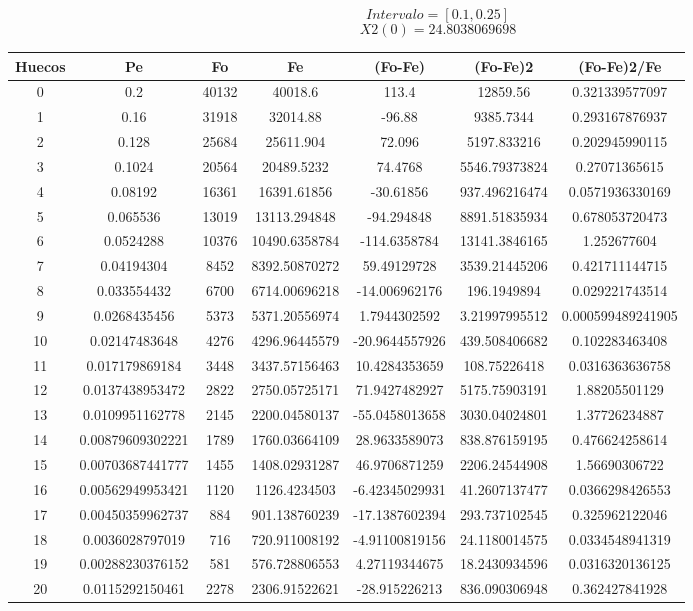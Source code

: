\documentclass{article}
\begin{document}
$$
Intervalo = [0.1, 0.25]
$$
$$
X2(0) = 24.8038069698
$$
\begin{tabular}{|c|c|c|c|c|c|c|}
Huecos&Pe&Fo&Fe&(Fo{-}Fe)&(Fo{-}Fe)2&(Fo{-}Fe)2/Fe\\
\hline
0&0.2&40132&40018.6&113.4&12859.56&0.321339577097\\
\hline
1&0.16&31918&32014.88&{-}96.88&9385.7344&0.293167876937\\
\hline
2&0.128&25684&25611.904&72.096&5197.833216&0.202945990115\\
\hline
3&0.1024&20564&20489.5232&74.4768&5546.79373824&0.27071365615\\
\hline
4&0.08192&16361&16391.61856&{-}30.61856&937.496216474&0.0571936330169\\
\hline
5&0.065536&13019&13113.294848&{-}94.294848&8891.51835934&0.678053720473\\
\hline
6&0.0524288&10376&10490.6358784&{-}114.6358784&13141.3846165&1.252677604\\
\hline
7&0.04194304&8452&8392.50870272&59.49129728&3539.21445206&0.421711144715\\
\hline
8&0.033554432&6700&6714.00696218&{-}14.006962176&196.1949894&0.029221743514\\
\hline
9&0.0268435456&5373&5371.20556974&1.7944302592&3.21997995512&0.000599489241905\\
\hline
10&0.02147483648&4276&4296.96445579&{-}20.9644557926&439.508406682&0.102283463408\\
\hline
11&0.017179869184&3448&3437.57156463&10.4284353659&108.75226418&0.0316363636758\\
\hline
12&0.0137438953472&2822&2750.05725171&71.9427482927&5175.75903191&1.88205501129\\
\hline
13&0.0109951162778&2145&2200.04580137&{-}55.0458013658&3030.04024801&1.37726234887\\
\hline
14&0.00879609302221&1789&1760.03664109&28.9633589073&838.876159195&0.476624258614\\
\hline
15&0.00703687441777&1455&1408.02931287&46.9706871259&2206.24544908&1.56690306722\\
\hline
16&0.00562949953421&1120&1126.4234503&{-}6.42345029931&41.2607137477&0.0366298426553\\
\hline
17&0.00450359962737&884&901.138760239&{-}17.1387602394&293.737102545&0.325962122046\\
\hline
18&0.0036028797019&716&720.911008192&{-}4.91100819156&24.1180014575&0.0334548941319\\
\hline
19&0.00288230376152&581&576.728806553&4.27119344675&18.2430934596&0.0316320136125\\
\hline
20&0.0115292150461&2278&2306.91522621&{-}28.915226213&836.090306948&0.362427841928\\
\end{tabular}
\end{document}
